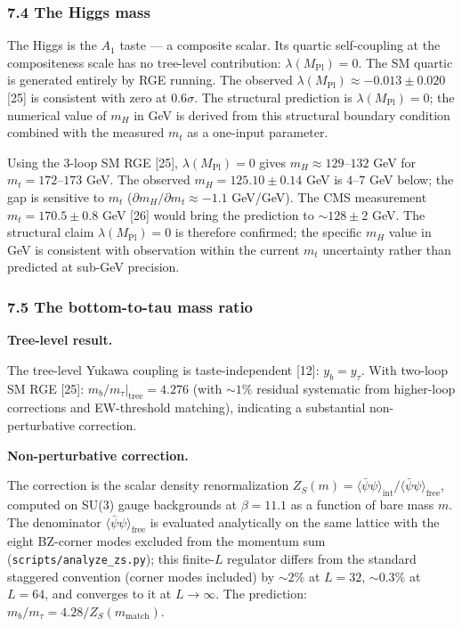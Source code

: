 \documentclass[
]{article}
\begin{document}
\hypertarget{the-higgs-mass}{%
\subsubsection{7.4 The Higgs mass}\label{the-higgs-mass}}

The Higgs is the \(A_1\) taste --- a composite scalar. Its quartic
self-coupling at the compositeness scale has no tree-level contribution:
\(\lambda(M_{\text{Pl}}) = 0\). The SM quartic is generated entirely by
RGE running. The observed
\(\lambda(M_{\text{Pl}}) \approx -0.013 \pm 0.020\) {[}25{]} is
consistent with zero at \(0.6\sigma\). The structural prediction is
\(\lambda(M_{\text{Pl}}) = 0\); the numerical value of \(m_H\) in GeV is
derived from this structural boundary condition combined with the
measured \(m_t\) as a one-input parameter.

Using the 3-loop SM RGE {[}25{]}, \(\lambda(M_{\text{Pl}}) = 0\) gives
\(m_H \approx 129\)--\(132\) GeV for \(m_t = 172\)--\(173\) GeV. The
observed \(m_H = 125.10 \pm 0.14\) GeV is \(4\)--\(7\) GeV below; the
gap is sensitive to \(m_t\) (\(\partial m_H/\partial m_t \approx -1.1\)
GeV/GeV). The CMS measurement \(m_t = 170.5 \pm 0.8\) GeV {[}26{]} would
bring the prediction to \(\sim 128 \pm 2\) GeV. The structural claim
\(\lambda(M_{\text{Pl}}) = 0\) is therefore confirmed; the specific
\(m_H\) value in GeV is consistent with observation within the current
\(m_t\) uncertainty rather than predicted at sub-GeV precision.

\hypertarget{the-bottom-to-tau-mass-ratio}{%
\subsubsection{7.5 The bottom-to-tau mass
ratio}\label{the-bottom-to-tau-mass-ratio}}

\textbf{Tree-level result.}

The tree-level Yukawa coupling is taste-independent {[}12{]}:
\(y_b = y_\tau\). With two-loop SM RGE {[}25{]}:
\(m_b/m_\tau|_{\text{tree}} = 4.276\) (with \(\sim 1\%\) residual
systematic from higher-loop corrections and EW-threshold matching),
indicating a substantial non-perturbative correction.

\textbf{Non-perturbative correction.}

The correction is the scalar density renormalization
\(Z_S(m) = \langle\bar\psi\psi\rangle_{\text{int}} / \langle\bar\psi\psi\rangle_{\text{free}}\),
computed on SU(3) gauge backgrounds at \(\beta = 11.1\) as a function of
bare mass \(m\). The denominator
\(\langle\bar\psi\psi\rangle_{\text{free}}\) is evaluated analytically
on the same lattice with the eight BZ-corner modes excluded from the
momentum sum (\texttt{scripts/analyze\_zs.py}); this finite-\(L\)
regulator differs from the standard staggered convention (corner modes
included) by \(\sim 2\%\) at \(L = 32\), \(\sim 0.3\%\) at \(L = 64\),
and converges to it at \(L \to \infty\). The prediction:
\(m_b/m_\tau = 4.28/Z_S(m_{\text{match}})\).
\end{document}
